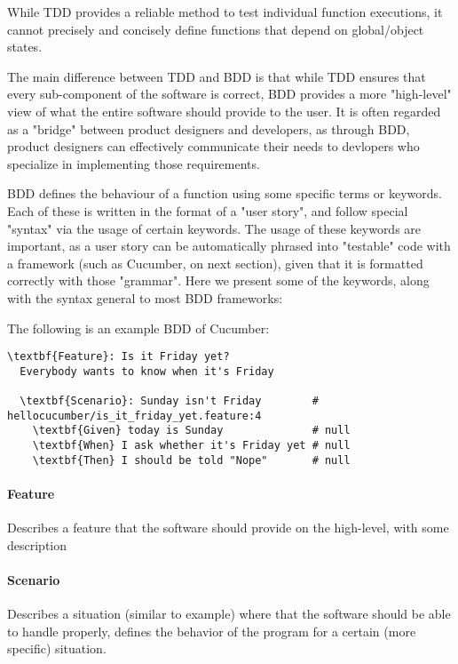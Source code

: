 While TDD provides a reliable method to test individual function executions, it cannot precisely and concisely define functions that depend on global/object states.

The main difference between TDD and BDD is that while TDD ensures that every sub-component of the software is correct, BDD provides a more "high-level" view of what the entire software should provide to the user. It is often regarded as a "bridge" between product designers and developers, as through BDD, product designers can effectively communicate their needs to devlopers who specialize in implementing those requirements. 

BDD defines the behaviour of a function using some specific terms or keywords. Each of these is written in the format of a "user story", and follow special "syntax" via the usage of certain keywords. The usage of these keywords are important, as a user story can be automatically phrased into "testable" code with a framework (such as Cucumber, on next section), given that it is formatted correctly with those "grammar". Here we present some of the keywords, along with the syntax general to most BDD frameworks:

The following is an example BDD of Cucumber:

\begin{lstlisting}
\textbf{Feature}: Is it Friday yet?
  Everybody wants to know when it's Friday

  \textbf{Scenario}: Sunday isn't Friday        # hellocucumber/is_it_friday_yet.feature:4
    \textbf{Given} today is Sunday              # null
    \textbf{When} I ask whether it's Friday yet # null
    \textbf{Then} I should be told "Nope"       # null
\end{lstlisting}

\paragraph{Feature}

Describes a feature that the software should provide on the high-level, with some description

\paragraph{Scenario}

Describes a situation (similar to example) where that the software should be able to handle properly, defines the behavior of the program for a certain (more specific) situation. 

